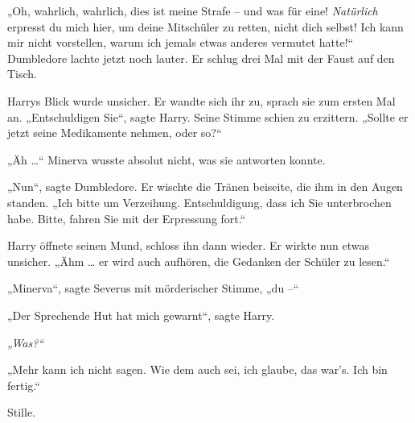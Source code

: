„Oh, wahrlich, wahrlich, dies ist meine Strafe – und was für eine! \emph{Natürlich} erpresst du mich hier, um deine Mitschüler zu retten, nicht dich selbst! Ich kann mir nicht vorstellen, warum ich jemals etwas anderes vermutet hatte!“ Dumbledore lachte jetzt noch lauter. Er schlug drei Mal mit der Faust auf den Tisch. 

Harrys Blick wurde unsicher. Er wandte sich ihr zu, sprach sie zum ersten Mal an. „Entschuldigen Sie“, sagte Harry. Seine Stimme schien zu erzittern. „Sollte er jetzt seine Medikamente nehmen, oder so?“ 

„Äh …“ Minerva wusste absolut nicht, was sie antworten konnte. 

„Nun“, sagte Dumbledore. Er wischte die Tränen beiseite, die ihm in den Augen standen. „Ich bitte um Verzeihung. Entschuldigung, dass ich Sie unterbrochen habe. Bitte, fahren Sie mit der Erpressung fort.“ 

Harry öffnete seinen Mund, schloss ihn dann wieder. Er wirkte nun etwas unsicher. „Ähm … er wird auch aufhören, die Gedanken der Schüler zu lesen.“ 

„Minerva“, sagte Severus mit mörderischer Stimme, „du –“ 

„Der Sprechende Hut hat mich gewarnt“, sagte Harry. 

\emph{„Was?“} 

„Mehr kann ich nicht sagen. Wie dem auch sei, ich glaube, das war’s. Ich bin fertig.“ 

Stille. 

